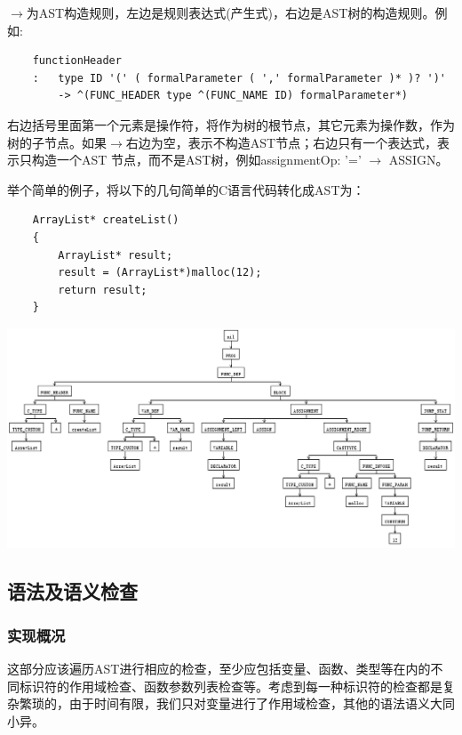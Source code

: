 \documentclass[a4paper]{article}
\begin{document}
\begin{CJK*}{UTF8}{gbsn}
    \par $\rightarrow$为AST构造规则，左边是规则表达式(产生式)，右边是AST树的构造规则。例如:
    \begin{verbatim}
    functionHeader
    :   type ID '(' ( formalParameter ( ',' formalParameter )* )? ')'
    	-> ^(FUNC_HEADER type ^(FUNC_NAME ID) formalParameter*)
    \end{verbatim}
    \par 右边括号里面第一个元素是操作符，将作为树的根节点，其它元素为操作数，作为树的子节点。如果$\rightarrow$右边为空，表示不构造AST节点；右边只有一个表达式，表示只构造一个AST 节点，而不是AST树，例如assignmentOp: '=' $\rightarrow$ ASSIGN。
    \par 举个简单的例子，将以下的几句简单的C语言代码转化成AST为：
    \begin{verbatim}
    ArrayList* createList()
    {
        ArrayList* result;
        result = (ArrayList*)malloc(12);
        return result;
    }
    \end{verbatim}
    \begin{center}
    \includegraphics[width=6in]{ASTdemo.png}
    \end{center}

    \subsection{语法及语义检查}
    \subsubsection{实现概况}
    这部分应该遍历AST进行相应的检查，至少应包括变量、函数、类型等在内的不同标识符的作用域检查、函数参数列表检查等。考虑到每一种标识符的检查都是复杂繁琐的，由于时间有限，我们只对变量进行了作用域检查，其他的语法语义大同小异。


\end{CJK*}
\end{document}
